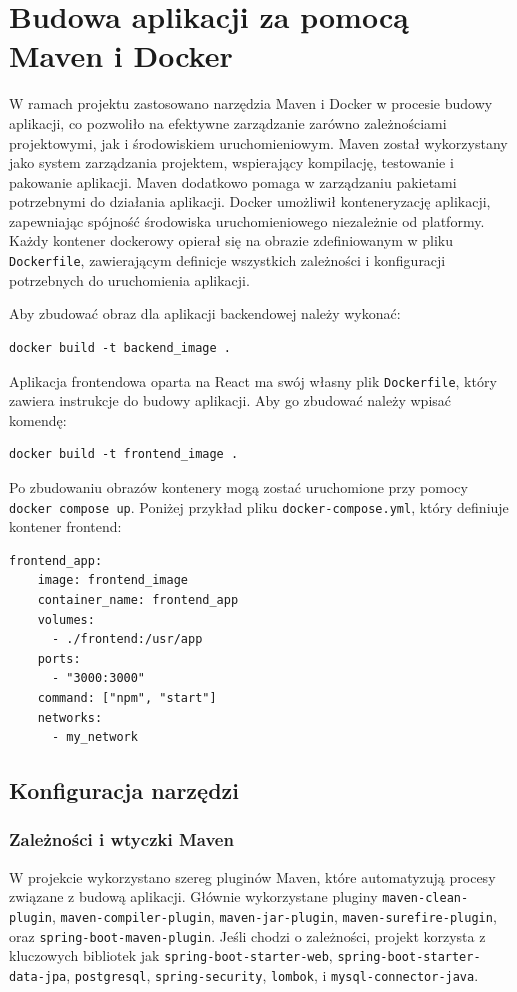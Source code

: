 \section{Budowa aplikacji za pomocą Maven i Docker}
W ramach projektu zastosowano narzędzia Maven i Docker w procesie budowy aplikacji, co pozwoliło na efektywne zarządzanie zarówno zależnościami projektowymi, jak i środowiskiem uruchomieniowym. Maven został wykorzystany jako system zarządzania projektem, wspierający kompilację, testowanie i pakowanie aplikacji. Maven dodatkowo pomaga w zarządzaniu pakietami potrzebnymi do działania aplikacji. Docker umożliwił konteneryzację aplikacji, zapewniając spójność środowiska uruchomieniowego niezależnie od platformy. Każdy kontener dockerowy opierał się na obrazie zdefiniowanym w pliku \texttt{Dockerfile}, zawierającym definicje wszystkich zależności i konfiguracji potrzebnych do uruchomienia aplikacji. 

Aby zbudować obraz dla aplikacji backendowej należy wykonać:
\begin{lstlisting}[basicstyle=\footnotesize\ttfamily]
docker build -t backend_image .
\end{lstlisting}

Aplikacja frontendowa oparta na React ma swój własny plik \texttt{Dockerfile}, który zawiera instrukcje do budowy aplikacji. Aby go zbudować należy wpisać komendę:
\begin{lstlisting}[basicstyle=\footnotesize\ttfamily]
docker build -t frontend_image .
\end{lstlisting}


Po zbudowaniu obrazów kontenery mogą zostać uruchomione przy pomocy \texttt{docker compose up}. Poniżej przykład pliku \texttt{docker-compose.yml}, który definiuje kontener frontend:
\begin{lstlisting}[basicstyle=\footnotesize\ttfamily]
  frontend_app:
    image: frontend_image
    container_name: frontend_app
    volumes:
      - ./frontend:/usr/app
    ports:
      - "3000:3000"
    command: ["npm", "start"]
    networks:
      - my_network
\end{lstlisting}

\subsection{Konfiguracja narzędzi} 

\subsubsection{Zależności i wtyczki Maven}
W projekcie wykorzystano szereg pluginów Maven, które automatyzują procesy związane z budową aplikacji. Głównie wykorzystane pluginy \texttt{maven-clean-plugin}, \texttt{maven-compiler-plugin}, \texttt{maven-jar-plugin}, \texttt{maven-surefire-plugin}, oraz \texttt{spring-boot-maven-plugin}.
Jeśli chodzi o zależności, projekt korzysta z kluczowych bibliotek jak \texttt{spring-boot-starter-web}, \texttt{spring-boot-starter-data-jpa}, \texttt{postgresql}, \texttt{spring-security}, \texttt{lombok}, i \texttt{mysql-connector-java}.

